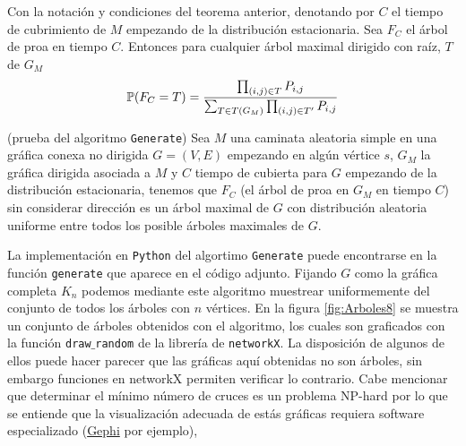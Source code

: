 \begin{theorem}
Con la notación y condiciones del teorema anterior, denotando por $C$ el tiempo de cubrimiento de $M$ empezando de la distribución estacionaria. Sea $F_{C}$ el árbol de proa en tiempo $C$. Entonces para cualquier árbol maximal dirigido con raíz, $T$ de $G_{M}$
$$\P(F_{C} = T) = \frac{\prod_{(i,j)\in T} P_{i,j}}{\sum_{T\in T(G_{M})} \prod_{(i,j)\in T'} P_{i,j}}$$
\end{theorem}

\begin{coro}
(prueba del algoritmo \texttt{Generate}) Sea $M$ una caminata aleatoria simple en una gráfica conexa no dirigida $G = (V, E)$ empezando en algún vértice $s$, $G_{M}$ la gráfica dirigida asociada a $M$ y $C$ tiempo de cubierta para $G$ empezando de la distribución estacionaria, tenemos que $F_{C}$ (el árbol de proa en $G_{M}$ en tiempo $C$) sin considerar dirección es un árbol maximal de $G$ con distribución aleatoria uniforme entre todos los posible árboles maximales de $G$.
\end{coro}

La implementación en \texttt{Python} del algortimo \texttt{Generate} puede encontrarse en la función \texttt{generate} que aparece en el código adjunto. Fijando $G$ como la gráfica completa $K_{n}$ podemos mediante este algoritmo muestrear uniformemente del conjunto de todos los árboles con $n$ vértices. En la figura \ref{fig:Arboles8} se muestra un conjunto de árboles obtenidos con el algoritmo, los cuales son graficados con la función \texttt{draw$\_$random} de la librería de \texttt{networkX}. La disposición de algunos de ellos puede hacer parecer que las gráficas aquí obtenidas no son árboles, sin embargo funciones en networkX permiten verificar lo contrario. Cabe mencionar que determinar el mínimo número de cruces es un problema NP-hard por lo que se entiende que la visualización adecuada de estás gráficas requiera software especializado (\href{https://gephi.org/}{Gephi} por ejemplo), 


